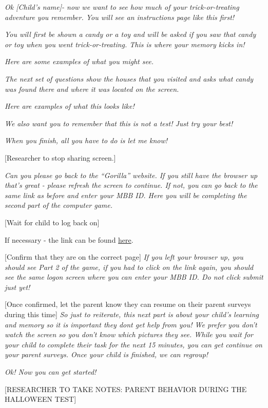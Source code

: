 \documentclass[]{book}
\begin{document}
\emph{Ok {[}Child's name{]}- now we want to see how much of your trick-or-treating adventure you remember. You will see an instructions page like this first!}

\emph{You will first be shown a candy or a toy and will be asked if you saw that candy or toy when you went trick-or-treating. This is where your memory kicks in!}

\emph{Here are some examples of what you might see.}

\emph{The next set of questions show the houses that you visited and asks what candy was found there and where it was located on the screen.}

\emph{Here are examples of what this looks like!}

\emph{We also want you to remember that this is not a test! Just try your best!}

\emph{When you finish, all you have to do is let me know!}

{[}Researcher to stop sharing screen.{]}

\emph{Can you please go back to the ``Gorilla'' website. If you still have the browser up that's great - please refresh the screen to continue. If not, you can go back to the same link as before and enter your MBB ID. Here you will be completing the second part of the computer game.}

{[}Wait for child to log back on{]}

If necessary - the link can be found \href{https://research.sc/participant/login/20451/publicid}{here}.

{[}Confirm that they are on the correct page{]} \emph{If you left your browser up, you should see Part 2 of the game, if you had to click on the link again, you should see the same logon screen where you can enter your MBB ID. Do not click submit just yet!}

{[}Once confirmed, let the parent know they can resume on their parent surveys during this time{]} \emph{So just to reiterate, this next part is about your child's learning and memory so it is important they dont get help from you! We prefer you don't watch the screen so you don't know which pictures they see. While you wait for your child to complete their task for the next 15 minutes, you can get continue on your parent surveys. Once your child is finished, we can regroup!}

\emph{Ok! Now you can get started!}

{[}RESEARCHER TO TAKE NOTES: PARENT BEHAVIOR DURING THE HALLOWEEN TEST{]}
\end{document}
